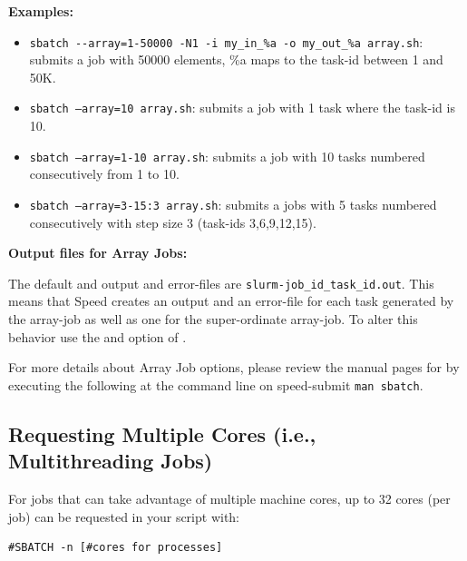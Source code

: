 \textbf{Examples:}
\begin{itemize}
\item
\verb+sbatch --array=1-50000 -N1 -i my_in_%a -o my_out_%a array.sh+: submits a job with 50000 elements,
\%a maps to the task-id between 1 and 50K. 
\item
\texttt{sbatch --array=10 array.sh}: submits a job with 1 task where the task-id is 10. 
\item
\texttt{sbatch --array=1-10 array.sh}: submits a job with 10 tasks numbered consecutively from 1 to 10.
\item
\texttt{sbatch --array=3-15:3 array.sh}: submits a jobs with 5 tasks numbered consecutively with step size 3
(task-ids 3,6,9,12,15).
\end{itemize}

\textbf{Output files for Array Jobs:}

The default and output and error-files are
\texttt{slurm-job\_id\_task\_id.out}.
%
This means that Speed creates an output and an error-file for each task 
generated by the array-job as well as one for the super-ordinate array-job. 
To alter this behavior use the  and  option of
. 

For more details about Array Job options, please review the manual pages for 
 by executing the following at the command line on speed-submit 
\texttt{man sbatch}.
 
\subsection{Requesting Multiple Cores (i.e., Multithreading Jobs)}

For jobs that can take advantage of multiple machine cores, up to 32 cores
(per job) can be requested in your script with: 

\begin{verbatim}
#SBATCH -n [#cores for processes] 
\end{verbatim}

